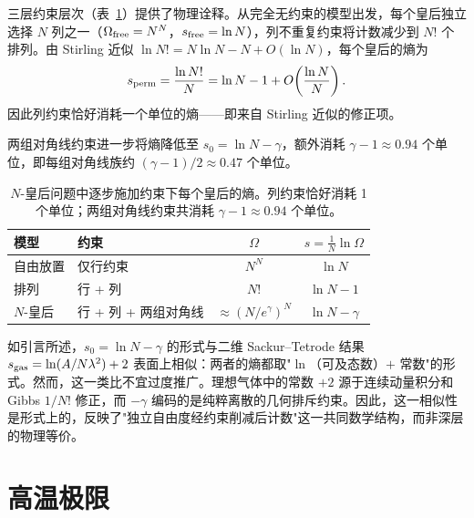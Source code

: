 \documentclass[aps, pre, reprint, amsmath, amssymb, superscriptaddress, floatfix]{revtex4-2}
\begin{document}
三层约束层次（表~\ref{tab:entropy_levels}）提供了物理诠释。从完全无约束的模型出发，每个皇后独立选择 $N$ 列之一（$\Omega_{\rm free} = N^N$，$s_{\rm free} = \ln N$），列不重复约束将计数减少到 $N!$ 个排列。由 Stirling 近似 $\ln N! = N\ln N - N + O(\ln N)$，每个皇后的熵为
\begin{equation}
  s_{\rm perm} = \frac{\ln N!}{N}
  = \ln N - 1 + O\!\left(\frac{\ln N}{N}\right).
  \label{eq:s_perm}
\end{equation}
因此列约束恰好消耗一个单位的熵——即来自 Stirling 近似的修正项。

两组对角线约束进一步将熵降低至 $s_0 = \ln N - \gamma$，额外消耗 $\gamma - 1 \approx 0.94$ 个单位，即每组对角线族约 $(\gamma - 1)/2 \approx 0.47$ 个单位。

\begin{table}[b]
  \caption{$N$-皇后问题中逐步施加约束下每个皇后的熵。列约束恰好消耗 1 个单位；两组对角线约束共消耗 $\gamma - 1 \approx 0.94$ 个单位。}
  \label{tab:entropy_levels}
  \begin{ruledtabular}
  \begin{tabular}{llcc}
    模型 & 约束 & $\Omega$ & $s = \frac{1}{N}\ln\Omega$ \\
    \hline
    自由放置 & 仅行约束 & $N^N$ & $\ln N$ \\
    排列 & 行 + 列 & $N!$ & $\ln N - 1$ \\
    $N$-皇后 & 行 + 列 + 两组对角线 & $\approx (N/e^\gamma)^N$
      & $\ln N - \gamma$ \\
  \end{tabular}
  \end{ruledtabular}
\end{table}

如引言所述，$s_0 = \ln N - \gamma$ 的形式与二维 Sackur--Tetrode 结果 $s_{\rm gas} = \ln(A/N\lambda^2) + 2$ 表面上相似：两者的熵都取"$\ln$（可及态数）$+$ 常数"的形式。然而，这一类比不宜过度推广。理想气体中的常数 $+2$ 源于连续动量积分和 Gibbs $1/N!$ 修正，而 $-\gamma$ 编码的是纯粹离散的几何排斥约束。因此，这一相似性是形式上的，反映了"独立自由度经约束削减后计数"这一共同数学结构，而非深层的物理等价。


\section{高温极限}
\label{sec:highT}
\end{document}
